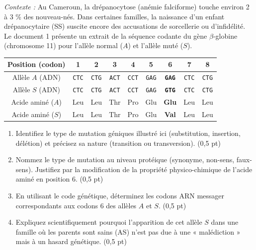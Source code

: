\documentclass[11pt]{article}
\begin{document}
\begin{exercice}
\emph{Contexte :} Au Cameroun, la drépanocytose (anémie falciforme) touche environ 2 à 3 \% des nouveau-nés. Dans certaines familles, la naissance d'un enfant drépanocytaire (SS) suscite encore des accusations de sorcellerie ou d'infidélité. Le document 1 présente un extrait de la séquence codante du gène $\beta$-globine (chromosome 11) pour l'allèle normal ($A$) et l'allèle muté ($S$).

\begin{center}
\begin{tabular}{|c|c|c|c|c|c|c|c|c|}
\hline
Position (codon) & 1 & 2 & 3 & 4 & 5 & \textbf{6} & 7 & 8 \\ \hline
Allèle $A$ (ADN) & \texttt{CTC} & \texttt{CTG} & \texttt{ACT} & \texttt{CCT} & \texttt{GAG} & \textbf{\texttt{GAG}} & \texttt{CTC} & \texttt{CTG} \\ \hline
Allèle $S$ (ADN) & \texttt{CTC} & \texttt{CTG} & \texttt{ACT} & \texttt{CCT} & \texttt{GAG} & \textbf{\texttt{GTG}} & \texttt{CTC} & \texttt{CTG} \\ \hline
Acide aminé ($A$) & Leu & Leu & Thr & Pro & Glu & \textbf{Glu} & Leu & Leu \\ \hline
Acide aminé ($S$) & Leu & Leu & Thr & Pro & Glu & \textbf{Val} & Leu & Leu \\ \hline
\end{tabular}
\end{center}
\begin{enumerate}
\item Identifiez le type de mutation géniques illustré ici (substitution, insertion, délétion) et précisez sa nature (transition ou transversion). \hfill (0,5 pt)
\item Nommez le type de mutation au niveau protéique (synonyme, non-sens, faux-sens). Justifiez par la modification de la propriété physico-chimique de l'acide aminé en position 6. \hfill (0,5 pt)
\item En utilisant le code génétique, déterminez les codons ARN messager correspondants aux codons 6 des allèles $A$ et $S$. \hfill (0,5 pt)
\item Expliquez scientifiquement pourquoi l'apparition de cet allèle $S$ dans une famille où les parents sont sains (AS) n'est pas due à une « malédiction » mais à un hasard génétique. \hfill (0,5 pt)
\end{enumerate}
\end{exercice}
\end{document}

